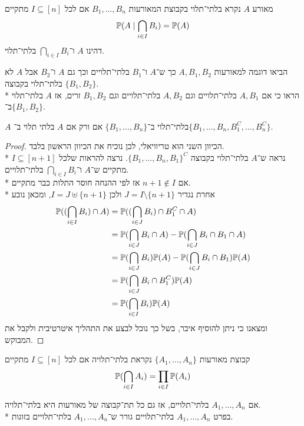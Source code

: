 \begin{definition}
	מאורע $A$ נקרא בלתי־תלוי בקבוצת המאורעות $B_1, \dots, B_n$ אם לכל $I \subseteq [n]$ מתקיים
	\[
		\mathbb{P}(A \mid \bigcap_{i \in I} B_i) = \mathbb{P}(A)
	\]
	דהינו $A$ ו־$\bigcap_{i \in I} B_i$ בלתי־תלוי.
\end{definition}
\begin{exercise}
	הביאו דוגמה למאורעות $A, B_1, B_2$ כך ש־$A$ ו־$B_1$ בלתי־תלויים וכך גם $A$ ו־$B_2$ אבל $A$ לא בלתי־תלוי בקבוצה $\{B_1, B_2\}$. \\*
	הראו כי אם $A, B_1$ בלתי־תלויים וגם $A, B_2$ בלתי־תלויים וגם $B_1, B_2$ זרים, אז $A$ בלתי־תלוי ב־$\{B_1, B_2\}$.
\end{exercise}
\begin{proposition}
	$A$ בלתי־תלוי ב־$\{B_1, \dots, B_n\}$ אם ורק אם $A$ בלתי תלוי ב־$\{B_1, \dots, B_n, B_1^C, \dots, B_n^C\}$.
\end{proposition}
\begin{proof}
	הכיוון השני הוא טריוויאלי, לכן נוכיח את הכיוון הראשון בלבד. \\*
	נראה ש־$A$ בלתי־תלוי בקבוצה ${\{B_1, \dots, B_n, B_1\}}^C$.
	נרצה להראות שלכל $I \subseteq [n + 1]$ מתקיים ש־$A$ ו־$\bigcap_{i \in I} B_i$ בלתי־תלויים. \\*
	אם $n + 1 \notin I$ אז לפי ההנחה חוסר התלות כבר מתקיים. \\*
	אחרת נגדיר $J = I \setminus \{ n + 1 \}$ ולכן $I = J \uplus \{ n + 1 \}$, ומכאן נובע
	\begin{align*}
		\mathbb{P}((\bigcap_{i \in I} B_i) \cap A)
		& = \mathbb{P}((\bigcap_{i \in J} B_i) \cap B_1^C \cap A) \\
		& = \mathbb{P}(\bigcap_{i \in J} B_i \cap A) - \mathbb{P}(\bigcap_{i \in J} B_i \cap B_1 \cap A) \\
		& = \mathbb{P}(\bigcap_{i \in J} B_i) \mathbb{P}(A) - \mathbb{P}(\bigcap_{i \in J} B_i \cap B_1) \mathbb{P}(A) \\
		& = \mathbb{P}(\bigcap_{i \in J} B_i \cap B_1^C) \mathbb{P}(A) \\
		& = \mathbb{P}(\bigcap_{i \in I} B_i) \mathbb{P}(A)
	\end{align*}
	ומצאנו כי ניתן להוסיף איבר, בשל כך נוכל לבצע את התהליך איטרטיבית ולקבל את המבוקש.
\end{proof}
\begin{definition}
	קבוצת מאורעות $\{A_1, \dots, A_n\}$ נקראת בלתי־תלויה אם לכל $I \subseteq [n]$ מתקיים
	\[
		\mathbb{P}(\bigcap_{i \in I} A_i) = \prod_{i \in I} \mathbb{P}(A_i)
	\]
\end{definition}
\begin{conclusion}
	אם $A_1, \dots, A_n$ בלתי־תלויים, אז גם כל תת־קבוצה של מאורעות היא בלתי־תלויה. \\*
	בפרט $A_1, \dots, A_n$ בלתי־תלויים גורר ש־$A_1, \dots, A_n$ בלתי־תלויים בזוגות.
\end{conclusion}
